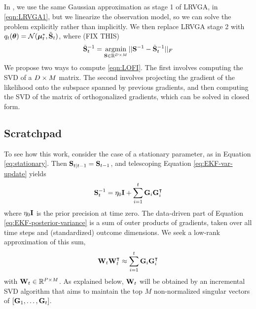\subsection{\lofi}

In \lofi, we use the same Gaussian approximation
as stage 1 of LRVGA,  in \cref{eqn:LRVGA1},
but we linearize the observation model,
so we can solve the problem explicitly rather than implicitly.
We then replace LRVGA stage 2 with
$q_t({\bm{\theta}}) = \mathcal{N}(\boldsymbol{\mu}_t^*,\tilde{\mathbf{S}}_t)$,
where (FIX THIS)
\begin{align}
  \tilde{\vS}^{-1}_t = \argmin_{\vS \in \real^{\nparams \times \memory}} ||\vS^{-1}-\tilde{\vS}_t^{-1}||_F
    \label{eqn:LOFI}
\end{align}
We propose two ways to compute
\cref{eqn:LOFI}.
The first involves computing the SVD of a $D \times M$ matrix.
The second involves projecting the gradient of the likelihood onto
the subspace spanned by previous gradients,
and then computing the SVD of the matrix of orthogonalized gradients,
which can be solved in closed form.





\subsection{Scratchpad}


To see how this work, consider the case of a stationary parameter,
as in Equation \eqref{eq:stationary}.
Then $\mathbf{S}_{t|t-1} = \mathbf{S}_{t-1}$, and telescoping Equation \eqref{eq:EKF-var-update} yields
\begin{align}
    \mathbf{S}_t^{-1} = \eta_0 \mathbf{I} + \sum_{i=1}^t \mathbf{G}_i\mathbf{G}_i^\intercal \label{eq:EKF-posterior-variance}
\end{align}
where $\eta_0 \mathbf{I}$ is the prior precision at time zero.
The data-driven part of Equation \eqref{eq:EKF-posterior-variance} is a sum of outer products of gradients,
taken over all time steps and (standardized) outcome dimensions. We seek a low-rank approximation of this sum,
\begin{align}
    \mathbf{W}_t\mathbf{W}_t^\intercal \approx \sum_{i=1}^t \mathbf{G}_i\mathbf{G}_i^\intercal
\end{align}
with $\mathbf{W}_t\in\mathbb{R}^{P\times M}$.
As explained below, $\mathbf{W}_t$ will be obtained by an incremental SVD algorithm that aims to maintain the top $M$ non-normalized singular vectors of $[\mathbf{G}_1,\dots,\mathbf{G}_t]$.


